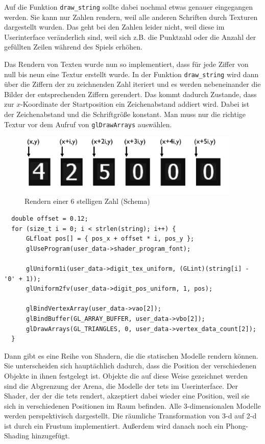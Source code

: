 \documentclass[11pt]{article}
\newcommand{\lstin}[1]{\lstinline[language=C]{#1}}
\begin{document}
Auf die Funktion \lstin{draw_string} sollte dabei nochmal etwas genauer eingegangen werden.
Sie kann nur Zahlen rendern, weil alle anderen Schriften durch Texturen dargestellt wurden.
Das geht bei den Zahlen leider nicht, weil diese im Userinterface veränderlich sind, 
weil sich z.B. die Punktzahl oder die Anzahl der gefüllten Zeilen während des Spiels erhöhen.

Das Rendern von Texten wurde nun so implementiert, dass für jede Ziffer von null bis neun eine Textur erstellt wurde.
In der Funktion \lstin{draw_string} wird dann über die Ziffern der zu zeichnenden Zahl iteriert 
und es werden nebeneinander die Bilder der entsprechenden Ziffern gerendert. 
Das kommt dadurch Zustande, dass zur $x$-Koordinate der Startposition ein Zeichenabstand addiert wird.  
Dabei ist der Zeichenabstand und die Schriftgröße konstant.
Man muss nur die richtige Textur vor dem Aufruf von \lstin{glDrawArrays} auswählen.

\begin{figure}[h]
  \centering
  \includegraphics[width=400px]{../images/font.jpg}
  \caption{Rendern einer 6 stelligen Zahl (Schema)}
\end{figure}

\begin{lstlisting}
  double offset = 0.12;
  for (size_t i = 0; i < strlen(string); i++) {
      GLfloat pos[] = { pos_x + offset * i, pos_y };
      glUseProgram(user_data->shader_program_font);

      glUniform1i(user_data->digit_tex_uniform, (GLint)(string[i] - '0' + 1));
      glUniform2fv(user_data->digit_pos_uniform, 1, pos);

      glBindVertexArray(user_data->vao[2]);
      glBindBuffer(GL_ARRAY_BUFFER, user_data->vbo[2]);
      glDrawArrays(GL_TRIANGLES, 0, user_data->vertex_data_count[2]);
  }
\end{lstlisting}

Dann gibt es eine Reihe von Shadern, die die statischen Modelle rendern können.
Sie unterscheiden sich hauptächlich dadurch, 
dass die Position der verschiedenen Objekte in ihnen festgelegt ist. 
Objekte die auf diese Weise gezeichnet werden sind die Abgrenzung der Arena, die Modelle der \glspl{tet} im Userinterface.
Der Shader, der der die \glspl{tet} rendert, akzeptiert dabei wieder eine Position, weil sie sich in verschiedenen Positionen im Raum befinden.
Alle 3-dimensionalen Modelle werden perspektivisch dargestellt. Die räumliche Transformation von 3-d auf 2-d ist durch ein Frustum implementiert.
Außerdem wird danach noch ein Phong-Shading hinzugefügt.
\end{document}
